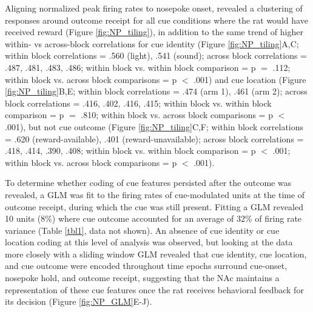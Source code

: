 \documentclass[11pt]{article}
\begin{document}
Aligning normalized peak firing rates to nosepoke onset, revealed a clustering of responses around outcome receipt for all cue conditions where the rat would have received reward (Figure \ref{fig:NP_tiling}), in addition to the same trend of higher within- vs across-block correlations for cue identity (Figure \ref{fig:NP_tiling}A,C; within block correlations = .560 (light), .541 (sound); across block correlations = .487, .481, .483, .486; within block vs. within block comparison = p $=$ .112; within block vs. across block comparisons = p $<$ .001) and cue location (Figure \ref{fig:NP_tiling}B,E; within block correlations = .474 (arm 1), .461 (arm 2); across block correlations = .416, .402, .416, .415; within block vs. within block comparison = p $=$ .810; within block vs. across block comparisons = p $<$ .001), but not cue outcome (Figure \ref{fig:NP_tiling}C,F; within block correlations = .620 (reward-available), .401 (reward-unavailable); across block correlations = .418, .414, .390, .408; within block vs. within block comparison = p $<$ .001; within block vs. across block comparisons = p $<$ .001). 

To determine whether coding of cue features persisted after the outcome was revealed, a GLM was fit to the firing rates of cue-modulated units at the time of outcome receipt, during which the cue was still present. Fitting a GLM revealed 10 units (8\%) where cue outcome accounted for an average of 32\% of firing rate variance (Table \ref{tbl1}, data not shown). An absence of cue identity or cue location coding at this level of analysis was observed, but looking at the data more closely with a sliding window GLM revealed that cue identity, cue location, and cue outcome were encoded throughout time epochs surround cue-onset, nosepoke hold, and outcome receipt, suggesting that the NAc maintains a representation of these cue features once the rat receives behavioral feedback for its decision (Figure \ref{fig:NP_GLM}E-J).
\end{document}
